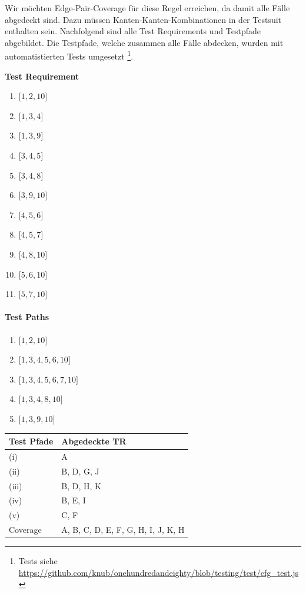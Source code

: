 \documentclass[ngerman]{article}
\begin{document}
Wir möchten Edge-Pair-Coverage für diese Regel erreichen, da damit alle Fälle abgedeckt sind.
Dazu müssen Kanten-Kanten-Kombinationen in der Testsuit enthalten sein.
Nachfolgend sind alle Test Requirements und Testpfade abgebildet. Die Testpfade, welche zusammen alle Fälle abdecken, wurden mit automatistierten Tests umgesetzt \footnote{Tests siehe \url{https://github.com/knub/onehundredandeighty/blob/testing/test/cfg_test.js}}.


\vspace{1em}


\begin{paracol}{2}
 \textbf{Test Requirement}
\begin{enumerate}[label=\Alph*]
\item $\lbrack 1,2,10 \rbrack$
\item $\lbrack 1,3,4\rbrack$
\item $\lbrack 1,3,9\rbrack$
\item $\lbrack 3,4,5\rbrack$
\item $\lbrack 3,4,8\rbrack$
\item $\lbrack 3,9,10\rbrack$
\item $\lbrack 4,5,6\rbrack$
\item $\lbrack 4,5,7\rbrack$
\item $\lbrack 4,8,10\rbrack$
\item $\lbrack 5,6,10\rbrack$
\item $\lbrack 5,7,10\rbrack$
\end{enumerate}

\switchcolumn
\paragraph{Test Paths}
\begin{enumerate}[label=(\roman*)]
\item $\lbrack 1, 2, 10 \rbrack$
\item $\lbrack 1, 3, 4, 5, 6, 10\rbrack$
\item $\lbrack 1, 3, 4, 5, 6, 7, 10\rbrack$
\item $\lbrack 1, 3, 4, 8, 10\rbrack$
\item $\lbrack 1, 3, 9, 10\rbrack$
\end{enumerate}

\begin{table}
\begin{tabular}{|l|p{2.5cm}|}
\hline
\textbf{Test Pfade} & \textbf{Abgedeckte TR} \\ \hline \hline
(i) & A\\ \hline
(ii)  & B, D, G, J \\ \hline
(iii) & B, D, H, K\\ \hline
(iv) & B, E, I\\ \hline
(v) & C, F\\ \hline \hline
Coverage & A, B, C, D, E, F, G, H, I, J, K, H\\ \hline
\end{tabular}
\end{table}

\end{paracol}
\end{document}
